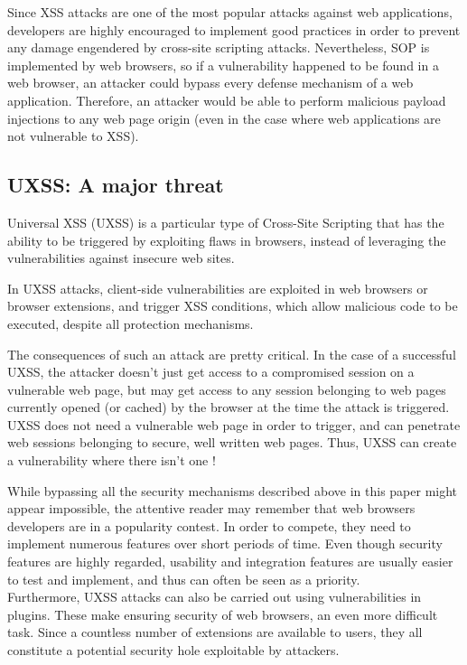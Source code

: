 \documentclass[journal]{IEEEtran}
\begin{document}
\medskip

Since XSS attacks are one of the most popular attacks against web applications, developers are highly encouraged to implement good practices in order to prevent any damage engendered by cross-site scripting attacks. Nevertheless, SOP is implemented by web browsers, so if a vulnerability happened to be found in a web browser, an attacker could bypass every defense mechanism of a web application. Therefore, an attacker would be able to perform malicious payload injections to any web page origin (even in the case where web applications are not vulnerable to XSS).

\subsection{UXSS: A major threat}

Universal XSS (UXSS) is a particular type of Cross-Site Scripting that has the ability to be triggered by exploiting flaws in browsers, instead of leveraging the vulnerabilities against insecure web sites.

\bigskip


\bigskip

In UXSS attacks, client-side vulnerabilities are exploited in web browsers or browser extensions, and trigger XSS conditions, which allow malicious code to be executed, despite all protection mechanisms.

\medskip

The consequences of such an attack are pretty critical. In the case of a successful UXSS, the attacker doesn't just get access to a compromised session on a vulnerable web page, but may get access to any session belonging to web pages currently opened (or cached) by the browser at the time the attack is triggered. UXSS does not need a vulnerable web page in order to trigger, and can penetrate web sessions belonging to secure, well written web pages. Thus, UXSS can create a vulnerability where there isn't one !

\medskip

While bypassing all the security mechanisms described above in this paper might appear impossible,
the attentive reader may remember that web browsers developers are in a popularity contest. In order to compete, they need to implement numerous features over short periods of time. Even though security features are highly regarded, usability and integration features are usually easier to test and implement, and thus can often be seen as a priority. \\
Furthermore, UXSS attacks can also be carried out using vulnerabilities in plugins. These make ensuring security of web browsers, an even more difficult task. Since a countless number of extensions are available to users, they all constitute a potential security hole exploitable by attackers.
\end{document}

